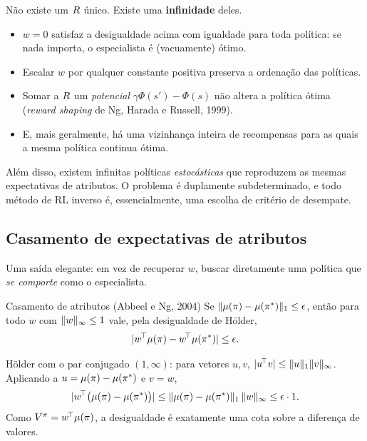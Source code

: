 \documentclass[11pt]{article}
\newcommand{\mufeat}{\mu}
\newcommand{\polE}{\pol^{*}}
\newcommand{\wv}{w}
\begin{document}
\begin{alertabox}
  Não existe um $R$ único. Existe uma \textbf{infinidade} deles.
  \begin{itemize}
    \item $\wv = 0$ satisfaz a desigualdade acima com igualdade para toda política: se
      nada importa, o especialista é (vacuamente) ótimo.
    \item Escalar $\wv$ por qualquer constante positiva preserva a ordenação das
      políticas.
    \item Somar a $R$ um \emph{potencial} $\gamma\Phi(s') - \Phi(s)$ não altera a
      política ótima (\emph{reward shaping} de Ng, Harada e Russell, 1999).
    \item E, mais geralmente, há uma vizinhança inteira de recompensas para as quais a
      mesma política continua ótima.
  \end{itemize}
  Além disso, existem infinitas políticas \emph{estocásticas} que reproduzem as mesmas
  expectativas de atributos. O problema é duplamente subdeterminado, e todo método de RL
  inverso é, essencialmente, uma escolha de critério de desempate.
\end{alertabox}

\subsection{Casamento de expectativas de atributos}

Uma saída elegante: em vez de recuperar $\wv$, buscar diretamente uma política que
\emph{se comporte} como o especialista.

\begin{teobox}{Casamento de atributos (Abbeel e Ng, 2004)}
  Se $\norm{\mufeat(\pol) - \mufeat(\polE)}_1 \le \epsilon$, então para todo $\wv$ com
  $\norm{\wv}_\infty \le 1$ vale, pela desigualdade de Hölder,
  \[
    \abs{\wv^{\!\top}\mufeat(\pol) - \wv^{\!\top}\mufeat(\polE)} \le \epsilon .
  \]
\end{teobox}

\begin{provabox}
Hölder com o par conjugado $(1,\infty)$: para vetores $u,v$,
$\lvert u^{\!\top}v\rvert \le \lVert u\rVert_1\lVert v\rVert_\infty$. Aplicando a
$u = \mufeat(\pol)-\mufeat(\polE)$ e $v = \wv$,
\[
  \abs{\wv^{\!\top}\bigl(\mufeat(\pol)-\mufeat(\polE)\bigr)}
    \le \norm{\mufeat(\pol)-\mufeat(\polE)}_1\,\norm{\wv}_\infty \le \epsilon\cdot 1 .
\]
Como $V^{\pol} = \wv^{\!\top}\mufeat(\pol)$, a desigualdade é exatamente uma cota sobre a
diferença de valores.
\end{provabox}
\end{document}
